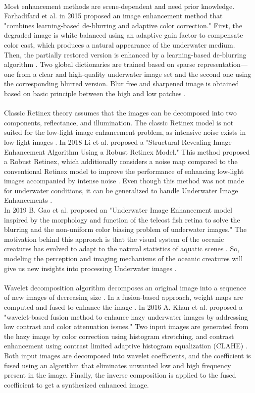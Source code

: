\documentclass[a4paper,11pt,oneside]{article}
\begin{document}
  \\
  Most enhancement methods are scene-dependent and need prior knowledge. Farhadifard et al. \cite{14} in 2015 proposed an image enhancement method that "combines learning-based de-blurring and adaptive color correction." First, the degraded image is white balanced using an adaptive gain factor to compensate color cast, which produces a natural appearance of the underwater medium. Then, the partially restored version is enhanced by a learning-based de-blurring algorithm \cite{14}. Two global dictionaries are trained based on sparse representation—one from a clear and high-quality underwater image set and the second one using the corresponding blurred version. Blur free and sharpened image is obtained based on basic principle between the high and low patches \cite{14}.\\
  \\
    Classic Retinex theory assumes that the images can be decomposed into two components, reflectance, and illumination. The classic Retinex model is not suited for the low-light image enhancement problem, as intensive noise exists in low-light images \cite{5}. In 2018 Li et al. \cite{5} proposed a "Structural Revealing Image Enhancement Algorithm Using a Robust Retinex Model." This method proposed a Robust Retinex, which additionally considers a noise map compared to the conventional Retinex model to improve the performance of enhancing low-light images accompanied by intense noise \cite{5}. Even though this method was not made for underwater conditions, it can be generalized to handle Underwater Image Enhancements \cite{5}.\\
  In 2019 B. Gao et al. \cite{6} proposed an "Underwater Image Enhancement model inspired by the morphology and function of the teleost fish retina to solve the blurring and the non-uniform color biasing problem of underwater images." The motivation behind this approach is that the visual system of the oceanic creatures has evolved to adapt to the natural statistics of aquatic scenes \cite{6}. So, modeling the perception and imaging mechanisms of the oceanic creatures will give us new insights into processing Underwater images \cite{6}.\\
  \\
   Wavelet decomposition algorithm decomposes an original image into a sequence of new images of decreasing size \cite{24}. In a fusion-based approach, weight maps are computed and fused to enhance the image \cite{10}.  In 2016 A. Khan et al. \cite{9} proposed a "wavelet-based fusion method to enhance hazy underwater images by addressing low contrast and color attenuation issues." Two input images are generated from the hazy image by color correction using histogram stretching, and contrast enhancement using contrast limited adaptive histogram equalization (CLAHE) \cite{9}. Both input images are decomposed into wavelet coefficients, and the coefficient is fused using an algorithm that eliminates unwanted low and high frequency present in the image. Finally, the inverse composition is applied to the fused coefficient to get a synthesized enhanced image. \cite{9}\\
\end{document}
